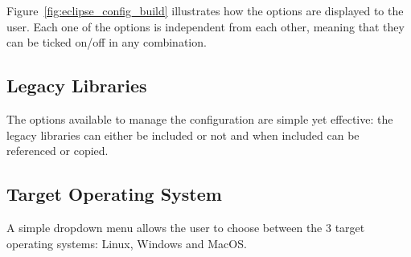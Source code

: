 Figure~\ref{fig:eclipse_config_build} illustrates how the options are displayed to the user. Each one of the options is independent from each other, meaning that they can be ticked on/off in any combination.


\subsection{Legacy Libraries}
\label{sec:dsl_legacy}

The options available to manage the configuration are simple yet effective: the legacy libraries can either be included or not and when included can be referenced or copied.



\subsection{Target Operating System}
\label{sec:dsl_os}

A simple dropdown menu allows the user to choose between the 3 target operating systems: Linux, Windows and MacOS.





















